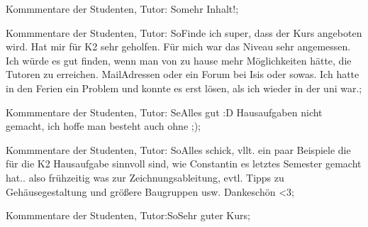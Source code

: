 \documentclass[10pt]{beamer}
\begin{document}
\begin{frame}[fragile]{Kommmentare der Studenten, Tutor: So}mehr Inhalt!;
 \end{frame}
\begin{frame}[fragile]{Kommmentare der Studenten, Tutor: So}Finde ich super, dass der Kurs angeboten wird. Hat mir für K2 sehr geholfen. Für mich war das Niveau sehr angemessen. 
 Ich würde es gut finden, wenn man von zu hause mehr Möglichkeiten hätte, die Tutoren zu erreichen. MailAdressen oder ein Forum bei Isis oder sowas. Ich hatte in den Ferien ein Problem und konnte es erst lösen, als ich wieder in der uni war.;
 \end{frame}
\begin{frame}[fragile]{Kommmentare der Studenten, Tutor: Se}Alles gut :D Hausaufgaben nicht gemacht, ich hoffe man besteht auch ohne ;);
 \end{frame}
\begin{frame}[fragile]{Kommmentare der Studenten, Tutor: So}Alles schick, vllt. ein paar Beispiele die für die K2 Hausaufgabe sinnvoll sind, wie Constantin es letztes Semester gemacht hat.. also frühzeitig was zur Zeichnungsableitung, evtl. Tipps zu Gehäusegestaltung und größere Baugruppen usw.
 Dankeschön <3;
 \end{frame}
\begin{frame}[fragile]{Kommmentare der Studenten, Tutor:So}Sehr guter Kurs;
 \end{frame}
\end{document}

